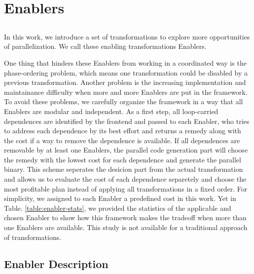 \section{Enablers}
\label{sec:enables}


\subsection{}




In this work, we introduce a set of transformations to explore more
opportunities of parallelization. We call these enabling transformations
Enablers.


One thing that hinders these Enablers from working in a coordinated way is the
phase-ordering problem, which means one transformation could be disabled by a
previous transformation. Another problem is the increasing implementation and
maintainance difficulty when more and more Enablers are put in the framework. To
avoid these problems, we carefully organize the framework in a way that all
Enablers are modular and independent. As a first step, all loop-carried
dependences are identified by the frontend and passed to each Enabler, who tries
to address each dependence by its best effort and returns a remedy along with
the cost if a way to remove the dependence is available. If all dependences are
removable by at least one Enablers, the parallel code generation part will
choose the remedy with the lowest cost for each dependence and generate the
parallel binary. This scheme seperates the desicion part from the actual
transformation and allows us to evaluate the cost of each dependence separetely
and choose the most profitable plan instead of applying all transformations in a
fixed order. For simplicity, we assigned to each Enabler a predefined cost in
this work. Yet in Table. \ref{table:enabler-stats}, we provided the statistics of the
applicable and chosen Enabler to show how this framework makes the tradeoff when
more than one Enablers are available. This study is not available for a
traditional approach of transformations.

\subsection{Enabler Description}

